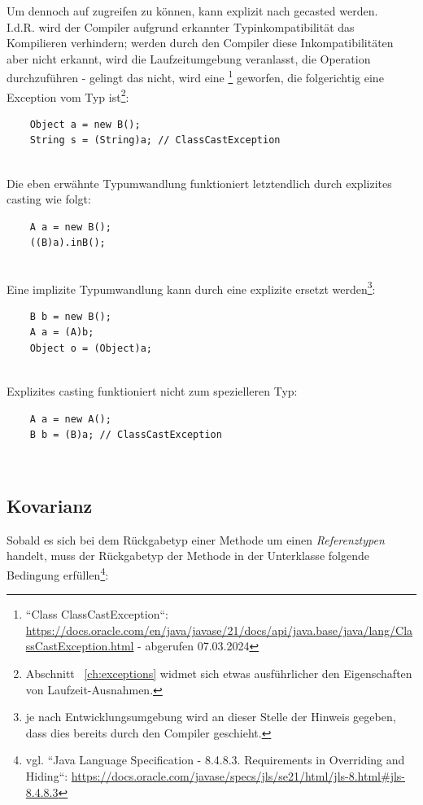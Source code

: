 \noindent
Um dennoch auf  zugreifen zu können, kann  explizit nach  gecasted werden.\\

\noindent
I.d.R. wird der Compiler aufgrund erkannter Typinkompatibilität das Kompilieren verhindern; werden durch den Compiler diese Inkompatibilitäten aber nicht erkannt, wird die Laufzeitumgebung veranlasst, die Operation durchzuführen - gelingt das nicht, wird eine \footnote{
``Class ClassCastException``: \url{https://docs.oracle.com/en/java/javase/21/docs/api/java.base/java/lang/ClassCastException.html} - abgerufen 07.03.2024
} geworfen, die folgerichtig eine Exception vom Typ  ist\footnote{
Abschnitt ~\ref{ch:exceptions} widmet sich etwas ausführlicher den Eigenschaften von Laufzeit-Ausnahmen.
}:

\begin{verbatim}
    Object a = new B();
    String s = (String)a; // ClassCastException
\end{verbatim}\\

\noindent
Die eben erwähnte Typumwandlung funktioniert letztendlich durch explizites casting wie folgt:

\begin{verbatim}
    A a = new B();
    ((B)a).inB();
\end{verbatim}\\

Eine implizite Typumwandlung kann durch eine explizite ersetzt werden\footnote{
    je nach Entwicklungsumgebung wird an dieser Stelle der Hinweis gegeben, dass dies bereits durch den Compiler geschieht.
}:

\begin{verbatim}
    B b = new B();
    A a = (A)b;
    Object o = (Object)a;
\end{verbatim}\\

\noindent
Explizites casting funktioniert nicht zum spezielleren Typ:

\begin{verbatim}
    A a = new A();
    B b = (B)a; // ClassCastException
\end{verbatim}\\


\subsection{Kovarianz}\label{subsec:covariance}
Sobald es sich bei dem Rückgabetyp einer Methode um einen \textit{Referenztypen} handelt, muss der Rückgabetyp der Methode in der Unterklasse folgende Bedingung erfüllen\footnote{
    vgl. ``Java Language Specification - 8.4.8.3. Requirements in Overriding and Hiding``: \url{https://docs.oracle.com/javase/specs/jls/se21/html/jls-8.html#jls-8.4.8.3}
}:

